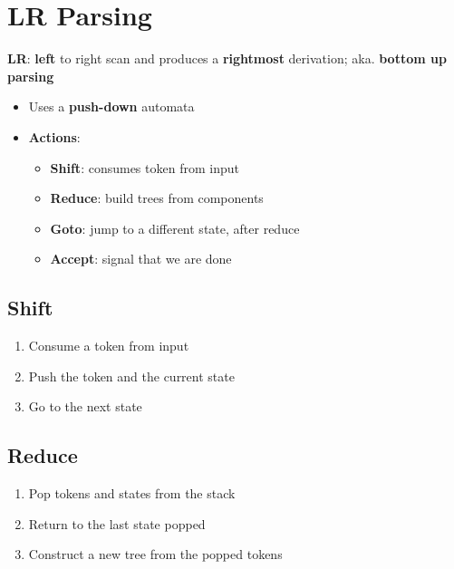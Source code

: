 \section{LR Parsing}

  \begin{definition}
    \textbf{LR}: \textbf{left} to right scan and produces a \textbf{rightmost}
    derivation; aka. \textbf{bottom up parsing}
  \end{definition}

  \begin{itemize}
    \item Uses a \textbf{push-down} automata
    \item \textbf{Actions}:
    \begin{itemize}
      \item \textbf{Shift}: consumes token from input
      \item \textbf{Reduce}: build trees from components
      \item \textbf{Goto}: jump to a different state, after reduce
      \item \textbf{Accept}: signal that we are done
    \end{itemize}
  \end{itemize}

  \subsection{Shift}

    \begin{enumerate}
      \item Consume a token from input
      \item Push the token and the current state
      \item Go to the next state
    \end{enumerate}

  \subsection{Reduce}

    \begin{enumerate}
      \item Pop tokens and states from the stack
      \item Return to the last state popped
      \item Construct a new tree from the popped tokens
    \end{enumerate}

